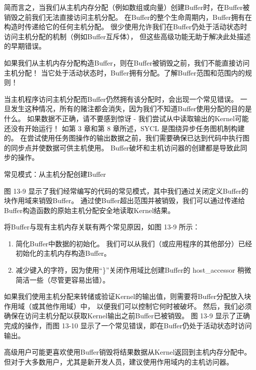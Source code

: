 简而言之，当我们从主机内存分配（例如数组或向量）创建Buffer时，在Buffer被销毁之前我们无法直接访问主机分配。 
在Buffer的整个生命周期内，Buffer拥有在构造时传递给它的任何主机分配。 
很少使用允许我们在Buffer仍处于活动状态时访问主机分配的机制（例如Buffer互斥体），
但这些高级功能无助于解决此处描述的早期错误。

\begin{remark}
如果我们从主机内存分配构造Buffer，则在Buffer被销毁之前，我们不能直接访问主机分配！
当它处于活动状态时，Buffer拥有分配。了解Buffer范围和范围内的规则！
\end{remark}

当主机程序访问主机分配而Buffer仍然拥有该分配时，会出现一个常见错误。 
一旦发生这种情况，所有的赌注都会消失，因为我们不知道Buffer使用分配的目的是什么。 
如果数据不正确，请不要感到惊讶 - 我们尝试从中读取输出的Kernel可能还没有开始运行！ 
如第 3 章和第 8 章所述，SYCL 是围绕异步任务图机制构建的。 
在尝试使用任务图操作的输出数据之前，我们需要确保已达到代码中执行图的同步点并使数据可供主机使用。 
Buffer破坏和主机访问器的创建都是导致此同步的操作。

{\color{red} 常见模式：从主机分配创建Buffer}

图 13-9 显示了我们经常编写的代码的常见模式，其中我们通过关闭定义Buffer的块作用域来销毁Buffer。 
通过使Buffer超出范围并被销毁，我们可以通过传递给Buffer构造函数的原始主机分配安全地读取Kernel结果。

将Buffer与现有主机内存关联有两个常见原因，如图 13-9 所示：

\begin{enumerate}
	\item 简化Buffer中数据的初始化。 我们可以从我们（或应用程序的其他部分）已经初始化的主机内存构造Buffer。

	\item 减少键入的字符，因为使用“\}”关闭作用域比创建Buffer的 host\_accessor 稍微简洁一些（尽管更容易出错）。
\end{enumerate}

如果我们使用主机分配来转储或验证Kernel的输出值，则需要将Buffer分配放入块作用域（或其他作用域）中，
以便我们可以控制它何时被破坏。 然后，我们必须确保在访问主机分配以获取Kernel输出之前Buffer已被销毁。 
图 13-9 显示了正确完成的操作，而图 13-10 显示了一个常见错误，即在Buffer仍处于活动状态时访问输出。

\begin{remark}
	高级用户可能更喜欢使用Buffer销毁将结果数据从Kernel返回到主机内存分配中。
	但对于大多数用户，尤其是新开发人员，建议使用作用域内的主机访问器。
\end{remark}

